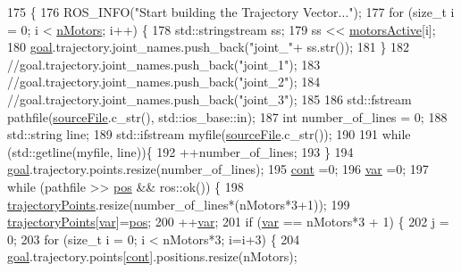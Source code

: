 \begin{DoxyCode}
175                                                                   \{
176   ROS\_INFO(\textcolor{stringliteral}{"Start building the Trajectory Vector..."});
177   \textcolor{keywordflow}{for} (\textcolor{keywordtype}{size\_t} i = 0; i < \hyperlink{_re_con_bot_8h_af9fc8046227b67fb8c85827f5ebc4838}{nMotors}; i++) \{
178     std::stringstream ss;
179     ss << \hyperlink{_re_con_bot_8h_a754c7486afa85fff30b8e7c0ce40c264}{motorsActive}[i];
180     \hyperlink{class_re_con_bot_a9bd1c7ddf2376e2e68ea5d8bd8c3f505}{goal}.trajectory.joint\_names.push\_back(\textcolor{stringliteral}{"joint\_"}+ ss.str());
181   \}
182   \textcolor{comment}{//goal.trajectory.joint\_names.push\_back("joint\_1");}
183   \textcolor{comment}{//goal.trajectory.joint\_names.push\_back("joint\_2");}
184   \textcolor{comment}{//goal.trajectory.joint\_names.push\_back("joint\_3");}
185 
186   std::fstream pathfile(\hyperlink{class_re_con_bot_a65cf4bed9bbabd92e1265d05507e0945}{sourceFile}.c\_str(), std::ios\_base::in);
187   \textcolor{keywordtype}{int} number\_of\_lines = 0;
188   std::string line;
189   std::ifstream myfile(\hyperlink{class_re_con_bot_a65cf4bed9bbabd92e1265d05507e0945}{sourceFile}.c\_str());
190 
191   \textcolor{keywordflow}{while} (std::getline(myfile, line))\{
192       ++number\_of\_lines;
193     \}
194   \hyperlink{class_re_con_bot_a9bd1c7ddf2376e2e68ea5d8bd8c3f505}{goal}.trajectory.points.resize(number\_of\_lines);
195   \hyperlink{class_re_con_bot_pub_a2b0249f374eb7a6ab7741a85d8ebd9d5}{cont} =0;
196   \hyperlink{class_re_con_bot_pub_ac2d5ba45905a24cfbdd78bce2dfe2a4f}{var} =0;
197   \textcolor{keywordflow}{while} (pathfile >> \hyperlink{class_re_con_bot_pub_a51311eed78ce3a444b35924c64ad3f4c}{pos} && ros::ok()) \{
198     \hyperlink{class_re_con_bot_a7c59e136741800bf0734f659119aa5ee}{trajectoryPoints}.resize(number\_of\_lines*(nMotors*3+1));
199     \hyperlink{class_re_con_bot_a7c59e136741800bf0734f659119aa5ee}{trajectoryPoints}[\hyperlink{class_re_con_bot_pub_ac2d5ba45905a24cfbdd78bce2dfe2a4f}{var}]=\hyperlink{class_re_con_bot_pub_a51311eed78ce3a444b35924c64ad3f4c}{pos};
200     ++\hyperlink{class_re_con_bot_pub_ac2d5ba45905a24cfbdd78bce2dfe2a4f}{var};
201     \textcolor{keywordflow}{if} (\hyperlink{class_re_con_bot_pub_ac2d5ba45905a24cfbdd78bce2dfe2a4f}{var} == nMotors*3 + 1) \{
202       \hyperlink{class_re_con_bot_pub_a1d9d82f366eeb794ffa28630de286710}{j} = 0;
203       \textcolor{keywordflow}{for} (\textcolor{keywordtype}{size\_t} i = 0; i < nMotors*3; i=i+3) \{
204         \hyperlink{class_re_con_bot_a9bd1c7ddf2376e2e68ea5d8bd8c3f505}{goal}.trajectory.points[\hyperlink{class_re_con_bot_pub_a2b0249f374eb7a6ab7741a85d8ebd9d5}{cont}].positions.resize(nMotors);

\end{DoxyCode}
